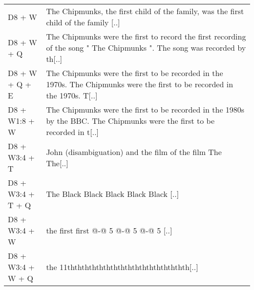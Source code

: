 {\begin{longtable}{@{}l p{\dimexpr\textwidth-3cm-4\tabcolsep}@{}}
D8 + W & The Chipmunks, the first child of the family, was the first child of the family [..] \\
D8 + W + Q & The Chipmunks were the first to record the first recording of the song " The Chipmunks ". The song was recorded by th[..] \\
D8 + W + Q + E & The Chipmunks were the first to be recorded in the 1970s. The Chipmunks were the first to be recorded in the 1970s. T[..] \\
D8 + W1:8 + W & The Chipmunks were the first to be recorded in the 1980s by the BBC. The Chipmunks were the first to be recorded in t[..] \\
D8 + W3:4 + T & John (disambiguation) and the film of the film The The[..] \\
D8 + W3:4 + T + Q & The Black Black Black Black Black [..] \\
D8 + W3:4 + W & the first first @-@ 5 @-@ 5 @-@ 5 [..] \\
D8 + W3:4 + W + Q & the 11ththththththththththththththththth[..] \\

\end{longtable}
}
\normalsize